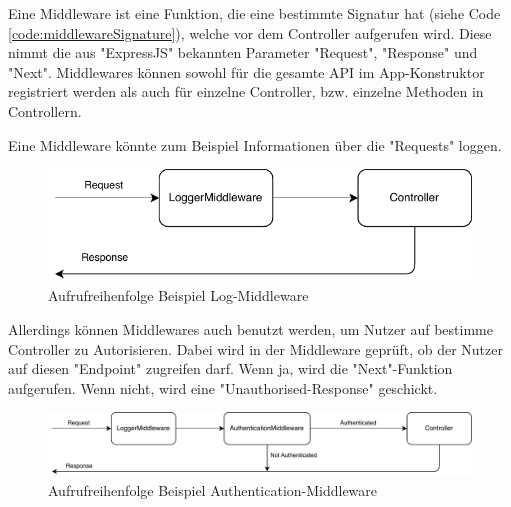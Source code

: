 \label{sec:middleware}

Eine Middleware ist eine Funktion, die eine bestimmte Signatur hat (siehe Code \ref{code:middlewareSignature}), welche vor dem Controller aufgerufen wird. Diese nimmt die aus "ExpressJS" bekannten Parameter "Request", "Response" und "Next". Middlewares können sowohl für die gesamte API im App-Konstruktor registriert werden als auch für einzelne Controller, bzw. einzelne Methoden in Controllern.


Eine Middleware könnte zum Beispiel Informationen über die "Requests" loggen. 

\begin{figure}[H]
    \centering
    \includegraphics{media/APITemplate/LogMiddleware.svg.pdf}
    \caption{Aufrufreihenfolge Beispiel Log-Middleware} 
\end{figure}

Allerdings können Middlewares auch benutzt werden, um Nutzer auf bestimme Controller zu Autorisieren. Dabei wird in der Middleware geprüft, ob der Nutzer auf diesen "Endpoint" zugreifen darf. Wenn ja, wird die "Next"-Funktion aufgerufen. Wenn nicht, wird eine "Unauthorised-Response" geschickt.

\begin{figure}[H]
    \centering
    \includegraphics[width=15cm]{media/APITemplate/AuthMiddleware.svg.pdf}
    \caption{Aufrufreihenfolge Beispiel Authentication-Middleware} 
\end{figure}
